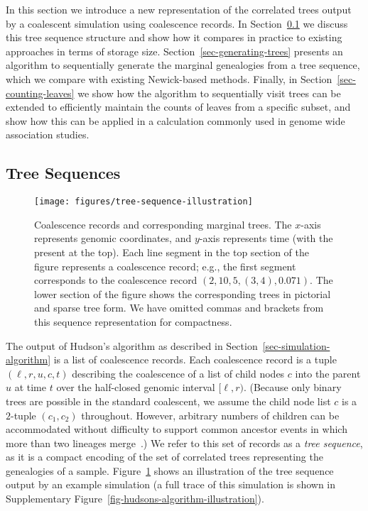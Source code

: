 \documentclass[10pt]{article}
\begin{document}
In this section we introduce a new representation of the correlated trees
output by a coalescent simulation using coalescence records. In
Section~\ref{sec-tree-sequences} we discuss this tree sequence structure and
show how it compares in practice to existing approaches in terms of storage
size. Section~\ref{sec-generating-trees} presents an algorithm to sequentially
generate the marginal genealogies from a tree sequence, which we compare with
existing Newick-based methods. Finally, in Section~\ref{sec-counting-leaves} we
show how the algorithm to sequentially visit trees can be extended to
efficiently maintain the counts of leaves from a specific subset, and show how
this can be applied in a calculation commonly used in genome wide association
studies.

\subsection{Tree Sequences}
\label{sec-tree-sequences}

\begin{figure}
    \begin{center}
        \texttt{[image: figures/tree-sequence-illustration]}
    \end{center}
    \caption{\label{fig-tree-sequence-illustration} Coalescence records
    and corresponding marginal trees. The $x$-axis represents genomic coordinates,
    and $y$-axis represents time (with the present at the top).
    Each line segment in the top section of the figure represents
    a coalescence record; e.g., the first segment corresponds to the
    coalescence record $(2, 10, 5, (3, 4), 0.071)$.
    The lower section of the figure shows the
    corresponding trees in pictorial and sparse tree
    form. We have omitted commas and brackets from this sequence
    representation for compactness.
}
\end{figure}

The output of Hudson's algorithm as described in
Section~\ref{sec-simulation-algorithm} is a list of coalescence records.
Each coalescence record is a tuple $(\ell, r, u, c, t)$
describing the coalescence of a list of child nodes $c$ into the parent $u$ at
time $t$ over the half-closed genomic interval $[\ell, r)$. (Because only
binary trees are possible in the standard coalescent, we assume the child node
list $c$ is a $2$-tuple $(c_1, c_2)$ throughout. However, arbitrary numbers of
children can be accommodated without difficulty to support
common ancestor events in which more than two lineages merge~\citep{dk99,p99,s99}.)
We refer to this set of records as a
\emph{tree sequence}, as it is a compact encoding of the set of correlated
trees representing the genealogies of a sample.
Figure~\ref{fig-tree-sequence-illustration} shows an illustration of
the tree sequence output by an example simulation (a full trace of this
simulation is shown in Supplementary Figure~\ref{fig-hudsons-algorithm-illustration}).
\end{document}
